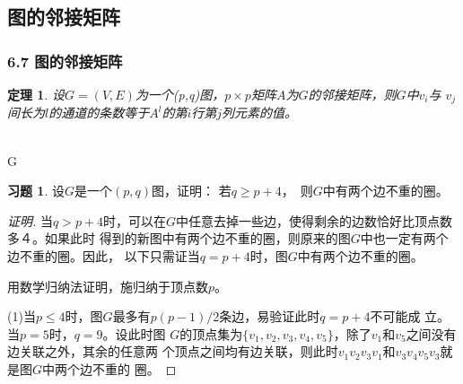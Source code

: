 \documentclass{beamer}
\newtheorem{Thm}{定理}[section]
\theoremstyle{definition}
\theoremstyle{example}
\newtheorem*{Exercise1}{习题}
\begin{document}
\begin{CJK*}{UTF8}{gbsn}
\section{图的邻接矩阵}

\begin{frame}
  \frametitle{6.7 图的邻接矩阵}
  \begin{Thm}
    设$G=(V,E)$为一个(p,q)图，$p\times p$矩阵$A$为$G$的邻接矩阵，则$G$中$v_i$与
    $v_j$间长为$l$的通道的条数等于$A^l$的第$i$行第$j$列元素的值。
  \end{Thm}
    \centering
 \\  G   
\end{frame}

\begin{frame}
    \begin{Exercise1}
    设$G$是一个$(p,q)$图，证明：
    若$q \geq p + 4$，　则$G$中有两个边不重的圈。
  \end{Exercise1}
  \begin{proof}[证明]
    当$q > p + 4$时，可以在$G$中任意去掉一些边，使得剩余的边数恰好比顶点数多４。如果此时
    得到的新图中有两个边不重的圈，则原来的图$G$中也一定有两个边不重的圈。因此，
    以下只需证当$q=p+4$时，图$G$中有两个边不重的圈。

    用数学归纳法证明，施归纳于顶点数$p$。

    (1)当$p \leq 4$时，图$G$最多有$p(p-1)/2$条边，易验证此时$q = p + 4$不可能成
    立。当$p = 5$时，$q = 9$。设此时图
    $G$的顶点集为$\{v_1,v_2,v_3,v_4,v_5\}$，除了$v_1$和$v_5$之间没有边关联之外，其余的任意两
    个顶点之间均有边关联，则此时$v_1v_2v_3v_1$和$v_3v_4v_5v_3$就是图$G$中两个边不重的
    圈。


\end{proof}
\end{frame}
\end{CJK*}
\end{document}
